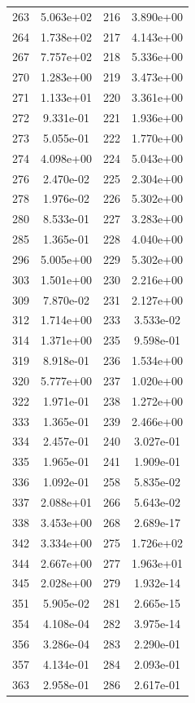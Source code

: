 \documentclass[12pt]{article}
\begin{document}
\begin{longtable}{@{}cccc@{}}
263 & 5.063e+02 & 216 & 3.890e+00 \\
264 & 1.738e+02 & 217 & 4.143e+00 \\
267 & 7.757e+02 & 218 & 5.336e+00 \\
270 & 1.283e+00 & 219 & 3.473e+00 \\
271 & 1.133e+01 & 220 & 3.361e+00 \\
272 & 9.331e-01 & 221 & 1.936e+00 \\
273 & 5.055e-01 & 222 & 1.770e+00 \\
274 & 4.098e+00 & 224 & 5.043e+00 \\
276 & 2.470e-02 & 225 & 2.304e+00 \\
278 & 1.976e-02 & 226 & 5.302e+00 \\
280 & 8.533e-01 & 227 & 3.283e+00 \\
285 & 1.365e-01 & 228 & 4.040e+00 \\
296 & 5.005e+00 & 229 & 5.302e+00 \\
303 & 1.501e+00 & 230 & 2.216e+00 \\
309 & 7.870e-02 & 231 & 2.127e+00 \\
312 & 1.714e+00 & 233 & 3.533e-02 \\
314 & 1.371e+00 & 235 & 9.598e-01 \\
319 & 8.918e-01 & 236 & 1.534e+00 \\
320 & 5.777e+00 & 237 & 1.020e+00 \\
322 & 1.971e-01 & 238 & 1.272e+00 \\
333 & 1.365e-01 & 239 & 2.466e+00 \\
334 & 2.457e-01 & 240 & 3.027e-01 \\
335 & 1.965e-01 & 241 & 1.909e-01 \\
336 & 1.092e-01 & 258 & 5.835e-02 \\
337 & 2.088e+01 & 266 & 5.643e-02 \\
338 & 3.453e+00 & 268 & 2.689e-17 \\
342 & 3.334e+00 & 275 & 1.726e+02 \\
344 & 2.667e+00 & 277 & 1.963e+01 \\
345 & 2.028e+00 & 279 & 1.932e-14 \\
351 & 5.905e-02 & 281 & 2.665e-15 \\
354 & 4.108e-04 & 282 & 3.975e-14 \\
356 & 3.286e-04 & 283 & 2.290e-01 \\
357 & 4.134e-01 & 284 & 2.093e-01 \\
363 & 2.958e-01 & 286 & 2.617e-01 \\

\end{longtable}
\end{document}
